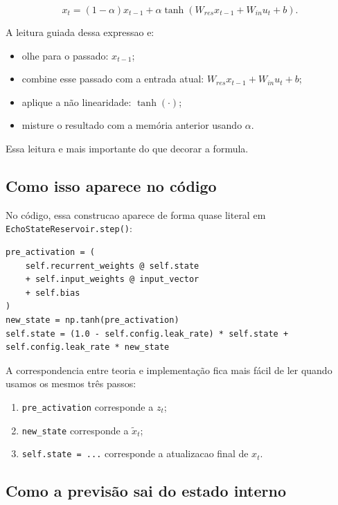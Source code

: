 \documentclass[12pt]{article}
\providecommand{\tightlist}{%
              \setlength{\itemsep}{0pt}\setlength{\parskip}{0pt}}
\begin{document}
\[
x_t = (1 - \alpha) x_{t-1} + \alpha \tanh(W_{res} x_{t-1} + W_{in} u_t + b).
\]

A leitura guiada dessa expressao e:

\begin{itemize}
\tightlist
\item
  olhe para o passado: \(x_{t-1}\);
\item
  combine esse passado com a entrada atual: \(W_{res} x_{t-1} + W_{in} u_t + b\);
\item
  aplique a não linearidade: \(\tanh(\cdot)\);
\item
  misture o resultado com a memória anterior usando \(\alpha\).
\end{itemize}

Essa leitura e mais importante do que decorar a formula.

\subsection{Como isso aparece no código}\label{38-como-isso-aparece-no-cuxf3digo}

No código, essa construcao aparece de forma quase literal em \texttt{EchoStateReservoir.step()}:

\begin{verbatim}
pre_activation = (
    self.recurrent_weights @ self.state
    + self.input_weights @ input_vector
    + self.bias
)
new_state = np.tanh(pre_activation)
self.state = (1.0 - self.config.leak_rate) * self.state + self.config.leak_rate * new_state
\end{verbatim}

A correspondencia entre teoria e implementação fica mais fácil de ler quando usamos os mesmos três passos:

\begin{enumerate}
\def\labelenumi{\arabic{enumi}.}
\tightlist
\item
  \texttt{pre\_activation} corresponde a \(z_t\);
\item
  \texttt{new\_state} corresponde a \(\widetilde{x}_t\);
\item
  \texttt{self.state\ =\ ...} corresponde a atualizacao final de \(x_t\).
\end{enumerate}

\subsection{Como a previsão sai do estado interno}\label{39-como-a-previsuxe3o-sai-do-estado-interno}
\end{document}
